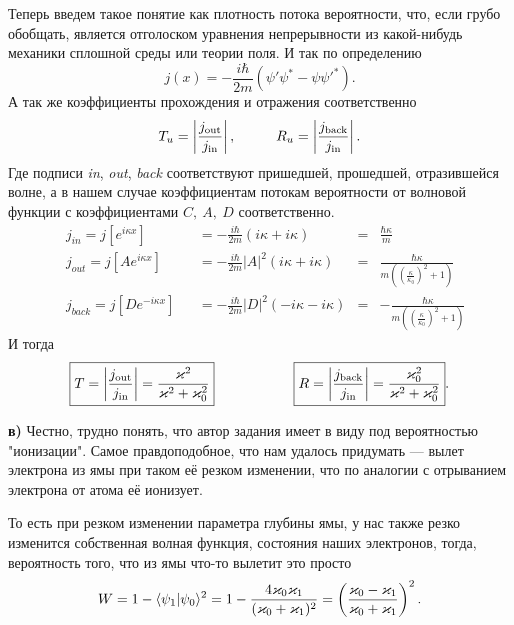 Теперь введем такое понятие как плотность потока вероятности, что, если грубо обобщать, является отголоском уравнения непрерывности из какой-нибудь механики сплошной среды или теории поля. И так по определению
\begin{equation*}
	j(x) = -\frac{i \hbar}{2 m} (\psi' \psi^* - \psi \psi'^*).
\end{equation*}
А так же коэффициенты прохождения и отражения соответственно
\begin{equation*}
	T_u = \left| \frac{j_\text{out}}{j_\text{in}}\right|,
	\hspace{1 cm}
	R_u = \left| \frac{j_\text{back}}{j_\text{in}}\right|.
\end{equation*}
Где подписи \textit{in}, \textit{out}, \textit{back} соответствуют пришедшей, прошедшей, отразившейся волне, а в нашем случае коэффициентам потокам вероятности от волновой функции с коэффициентами $C,\ A, \ D$ соответственно.
\begin{equation*}
	\begin{aligned}
		&j_\textit{in} = j [e^{i \kappa x}]& &= - \frac{i \hbar}{2 m}(i \kappa + i \kappa) &=& \frac{\hbar \kappa}{m}\\
		&j_\textit{out} = j [A e^{i \kappa x}]& &= - \frac{i \hbar}{2 m}|A|^2(i \kappa + i \kappa) &=& \frac{\hbar \kappa}{m\left(\left(\frac{\kappa}{\kappa_0}\right)^2 + 1\right)}\\
		&j_\textit{back} = j [D e^{-i \kappa x}]& &= - \frac{i \hbar}{2 m} |D|^2( -i \kappa - i \kappa) &=& -\frac{\hbar \kappa}{m\left(\left(\frac{\kappa}{\kappa_0}\right)^2 + 1\right)}
	\end{aligned}
\end{equation*}
И тогда
\begin{equation*}
	\boxed{T = \left|\frac{j_\text{out}}{j_\text{in}}\right| = \frac{\kappa^2}{\kappa^2 + \kappa_0^2}}
	\hspace{2 cm}
	\boxed{R = \left|\frac{j_\text{back}}{j_\text{in}}\right| = \frac{\kappa_0^2}{\kappa^2 + \kappa_0^2}}.
\end{equation*}


\phantom{42}

\textbf{в)} Честно, трудно понять, что автор задания имеет в виду под вероятностью "ионизации". Самое правдоподобное, что нам удалось придумать --- вылет электрона из ямы при таком её резком изменении, что по аналогии с отрыванием электрона от атома её ионизует. 

То есть при резком изменении параметра глубины ямы, у нас также резко изменится собственная волная функция, состояния наших электронов, тогда, вероятность того, что из ямы что-то вылетит это просто
\begin{equation*}
	W = 1 - \bk{\psi_1}{\psi_0}^2 = 1 - \frac{4 \kappa_0 \kappa_1}{(\kappa_0 + \kappa_1)^2} = \left(\frac{\kappa_0 - \kappa_1}{\kappa_0 + \kappa_1}\right)^2.
\end{equation*}

